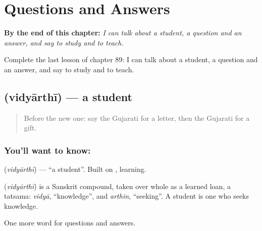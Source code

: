 
\chapter{Questions and Answers}
\label{ch:gu-questions-and-answers}

\begin{chapteropening}
\textbf{By the end of this chapter:} \emph{I can talk about a student, a question and an answer, and say to study and to teach.}

Complete the last lesson of chapter 89: I can talk about a student, a question and an answer, and say to study and to teach.
\end{chapteropening}

\section[\texorpdfstring{\gu{વિદ્યાર્થી} (vidyārthī)}{વિદ્યાર્થી (vidyārthī)}]{ (vidyārthī) — a student}

\label{lesson:GU-C89-student}



\begin{quote}
Before the new one: say the Gujarati for a letter, then the Gujarati for a gift.
\end{quote}

\subsection*{You'll want to know: }
\textbf{} (\emph{vidyārthī}) — \textquotedblleft{}a student\textquotedblright{}. Built on \textbf{}, learning.

\begin{cousinweb}
\textbf{} (\emph{vidyārthī}) is a Sanskrit compound, taken over whole as a learned loan, a tatsama: \emph{vidyā}, \textquotedblleft{}knowledge\textquotedblright{}, and \emph{arthin}, \textquotedblleft{}seeking\textquotedblright{}. A student is one who seeks knowledge.
\end{cousinweb}

\begin{grammarlens}[title={What you've built}]
One more word for questions and answers.
\end{grammarlens}

